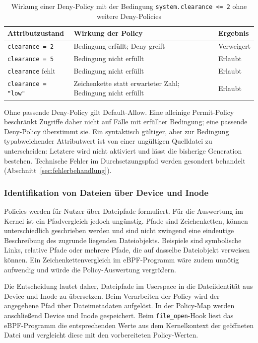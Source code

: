 \begin{table}[htbp]
    \centering
    \begin{tabular}{p{}p{}p{}}
        \hline
        \textbf{Attributzustand} & \textbf{Wirkung der Policy} & \textbf{Ergebnis} \\
        \hline
        \texttt{clearance = 2} & Bedingung erfüllt; Deny greift & Verweigert \\
        \texttt{clearance = 5} & Bedingung nicht erfüllt & Erlaubt \\
        \texttt{clearance} fehlt & Bedingung nicht erfüllt & Erlaubt \\
        \texttt{clearance = "low"} & Zeichenkette statt erwarteter Zahl; Bedingung nicht erfüllt & Erlaubt \\
        \hline
    \end{tabular}
    \caption{Wirkung einer Deny-Policy mit der Bedingung \texttt{system.clearance <= 2} ohne weitere Deny-Policies}
    \label{tab:policy-semantik-beispiel}
\end{table}

Ohne passende Deny-Policy gilt Default-Allow. Eine alleinige Permit-Policy beschränkt Zugriffe daher nicht auf Fälle mit erfüllter Bedingung; eine passende Deny-Policy überstimmt sie. Ein syntaktisch gültiger, aber zur Bedingung typabweichender Attributwert ist von einer ungültigen Quelldatei zu unterscheiden: Letztere wird nicht aktiviert und lässt die bisherige Generation bestehen. Technische Fehler im Durchsetzungspfad werden gesondert behandelt (Abschnitt~\ref{sec:fehlerbehandlung}).


\subsubsection{Identifikation von Dateien über Device und Inode}\label{sec:dateiidentifikation-konzept}
Policies werden für Nutzer über Dateipfade formuliert.
Für die Auswertung im Kernel ist ein Pfadvergleich jedoch ungünstig.
Pfade sind Zeichenketten, können unterschiedlich geschrieben werden und sind nicht zwingend eine eindeutige Beschreibung des zugrunde liegenden Dateiobjekts.
Beispiele sind symbolische Links, relative Pfade oder mehrere Pfade, die auf dasselbe Dateiobjekt verweisen können.
Ein Zeichenkettenvergleich im eBPF-Programm wäre zudem unnötig aufwendig und würde die Policy-Auswertung vergrößern.

Die Entscheidung lautet daher, Dateipfade im Userspace in die Dateiidentität aus Device und Inode zu übersetzen.
Beim Verarbeiten der Policy wird der angegebene Pfad über Dateimetadaten aufgelöst.
In der Policy-Map werden anschließend Device und Inode gespeichert.
Beim \texttt{file\_open}-Hook liest das eBPF-Programm die entsprechenden Werte aus dem Kernelkontext der geöffneten Datei und vergleicht diese mit den vorbereiteten Policy-Werten.

